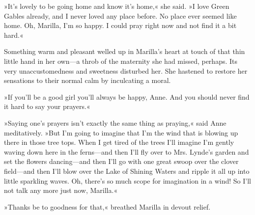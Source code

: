 »It’s lovely to be going home and know it’s home,« she said. »I love Green Gables already, and I never loved any place before. No place ever seemed like home. Oh, Marilla, I’m so happy. I could pray right now and not find it a bit hard.«

Something warm and pleasant welled up in Marilla’s heart at touch of that thin little hand in her own—a throb of the maternity she had missed, perhaps. Its very unaccustomedness and sweetness disturbed her. She hastened to restore her sensations to their normal calm by inculcating a moral.

»If you’ll be a good girl you’ll always be happy, Anne. And you should never find it hard to say your prayers.«

»Saying one’s prayers isn’t exactly the same thing as praying,« said Anne meditatively. »But I’m going to imagine that I’m the wind that is blowing up there in those tree tops. When I get tired of the trees I’ll imagine I’m gently waving down here in the ferns—and then I’ll fly over to Mrs. Lynde’s garden and set the flowers dancing—and then I’ll go with one great swoop over the clover field—and then I’ll blow over the Lake of Shining Waters and ripple it all up into little sparkling waves. Oh, there’s so much scope for imagination in a wind! So I’ll not talk any more just now, Marilla.«

»Thanks be to goodness for that,« breathed Marilla in devout relief.

